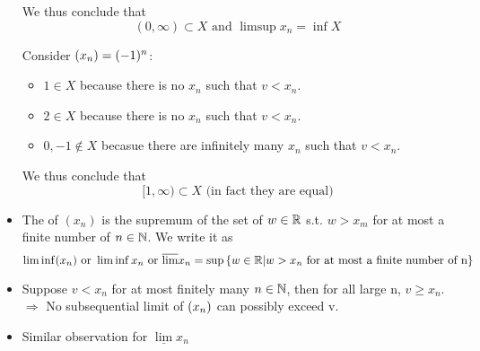 \documentclass[a4paper,12pt]{article}
\begin{document}
\begin{definition}
\begin{itemize}
\begin{example}
                We thus conclude that \[(0,\infty)\subset X\text{ and } \limsup{x_n} = \inf{X}\]
            \end{example}

            \begin{example}
                Consider \((x_{n}) = (-1)^n\):
                \begin{center}
                \end{center}
                \begin{itemize}
                    \item \(1\in X\) because there is no \(x_n\) such that \(v<x_n\).
                    \item \(2\in X\) because there is no \(x_n\) such that \(v<x_n\).
                    \item \(0,-1\notin X\) becasue there are infinitely many \(x_n\) such that \(v<x_n\).
                \end{itemize}
                We thus conclude that \[[1,\infty)\subset X\text{ (in fact they are equal)}\]
            \end{example}
            \item The  of \((x_n)\) is the supremum of the set of \(w\in\mathbb{R}\) s.t. \(w >x_m\) for at most a finite number of \(n\in\mathbb{N}\). We write it as
            \[\liminf(x_n)\text{ or }\liminf x_n\text{ or }\overline{\lim}x_n = \sup{\{w\in\mathbb{R}|w>x_n\text{ for at most a finite number of n}\}}\]
        \end{itemize}
    \end{definition}
    

    \begin{itemize}
        \item Suppose \(v<x_n\) for at most finitely many \(n\in\mathbb{N}\), then for all large n, \(v\ge x_n\). \\\(\Rightarrow\) No subsequential limit of \((x_{n})\) can possibly exceed v.
        \item Similar observation for \(\underline{\lim{}}x_n\)\\
    \end{itemize}
\end{document}
